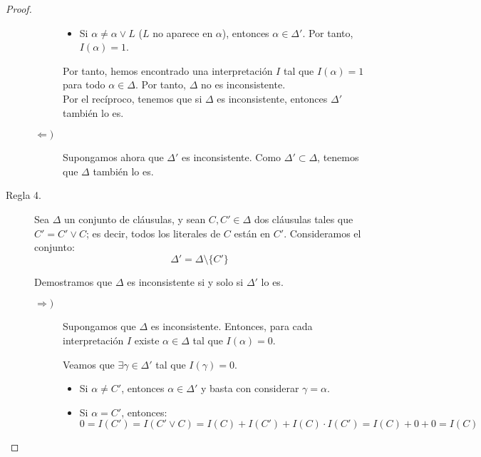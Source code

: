 \documentclass[12pt]{article}
\begin{document}
\begin{ejercicio}
\begin{proof}
\begin{description}
\begin{description}
\begin{itemize}
                        \item Si $\alpha\neq \alpha\lor L$ ($L$ no aparece en $\alpha$), entonces $\alpha\in \Delta'$. Por tanto, $I(\alpha)=1$.
                    \end{itemize}

                    Por tanto, hemos encontrado una interpretación $I$ tal que $I(\alpha)=1$ para todo $\alpha\in \Delta$. Por tanto, $\Delta$ no es inconsistente.\\

                    Por el recíproco, tenemos que si $\Delta$ es inconsistente, entonces $\Delta'$ también lo es.

                    \item[$\Longleftarrow)$] Supongamos ahora que $\Delta'$ es inconsistente. Como $\Delta'\subset \Delta$, tenemos que $\Delta$ también lo es.
                \end{description}

                \item[Regla 4.] Sea $\Delta$ un conjunto de cláusulas, y sean $C,C'\in \Delta$ dos cláusulas tales que $C'=C'\lor C$; es decir, todos los literales de $C$ están en $C'$.
                Consideramos el conjunto:
                \begin{equation*}
                    \Delta'=\Delta\setminus \{C'\}
                \end{equation*}
                
                Demostramos que $\Delta$ es inconsistente si y solo si $\Delta'$ lo es.
                \begin{description}
                    \item[$\Longrightarrow)$] Supongamos que $\Delta$ es inconsistente. Entonces, para cada interpretación $I$ existe $\alpha\in \Delta$ tal que $I(\alpha)=0$.
                    
                    Veamos que $\exists \gamma\in \Delta'$ tal que $I(\gamma)=0$.
                    \begin{itemize}
                        \item Si $\alpha\neq C'$, entonces $\alpha\in \Delta'$ y basta con considerar $\gamma=\alpha$.
                        
                        \item Si $\alpha=C'$, entonces:
                        \begin{equation*}
                            0=I(C')=I(C'\lor C)=I(C)+I(C')+I(C)\cdot I(C')=I(C)+0+0=I(C)
                        \end{equation*}


\end{itemize}
\end{description}
\end{description}
\end{proof}
\end{ejercicio}
\end{document}
